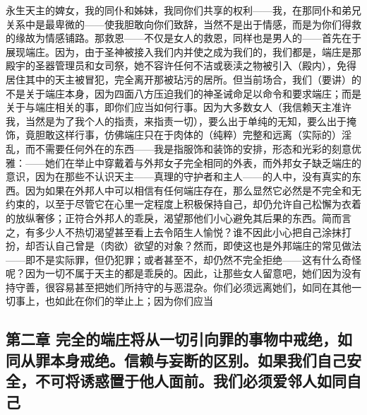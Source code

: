 永生天主的婢女，我的同仆和姊妹，我同你们共享的权利——我，在那同仆和弟兄关系中是最卑微的——使我胆敢向你们致辞，当然不是出于情感，而是为你们得救的缘故为情感铺路。那救恩——不仅是女人的救恩，同样也是男人的——首先在于展现端庄。因为，由于圣神被接入我们内并使之成为我们的，我们都是，端庄是那殿宇的圣器管理员和女司祭，她不容许任何不洁或亵渎之物被引入（殿内），免得居住其中的天主被冒犯，完全离开那被玷污的居所。但当前场合，我们（要讲）的不是关于端庄本身，因为四面八方压迫我们的神圣诫命足以命令和要求端庄；而是关于与端庄相关的事，即你们应当如何行事。因为大多数女人（我信赖天主准许我，当然是为了我个人的指责，来指责一切），要么出于单纯的无知，要么出于掩饰，竟胆敢这样行事，仿佛端庄只在于肉体的（纯粹）完整和远离（实际的）淫乱，而不需要任何外在的东西——我是指服饰和装饰的安排，形态和光彩的刻意优雅：——她们在举止中穿戴着与外邦女子完全相同的外表，而外邦女子缺乏端庄的意识，因为在那些不认识天主——真理的守护者和主人——的人中，没有真实的东西。因为如果在外邦人中可以相信有任何端庄存在，那么显然它必然是不完全和无约束的，以至于尽管它在心里一定程度上积极保持自己，却仍允许自己松懈为衣着的放纵奢侈；正符合外邦人的乖戾，渴望那他们小心避免其后果的东西。简而言之，有多少人不热切渴望甚至看上去令陌生人愉悦？谁不因此小心把自己涂抹打扮，却否认自己曾是（肉欲）欲望的对象？然而，即使这也是外邦端庄的常见做法——即不是实际罪，但仍犯罪；或者甚至不，却仍然不完全拒绝——这有什么奇怪呢？因为一切不属于天主的都是乖戾的。因此，让那些女人留意吧，她们因为没‌有持守善，很容易甚至把她们所持守的与恶混杂。你们必须远离她们，如同在其他一切事上，也如此在你们的举止上；因为你们应当\par


\subsection{第二章 完全的端庄将从一切引向罪的事物中戒绝，如同从罪本身戒绝。信赖与妄断的区别。如果我们自己安全，不可将诱惑置于他人面前。我们必须爱邻人如同自己}

